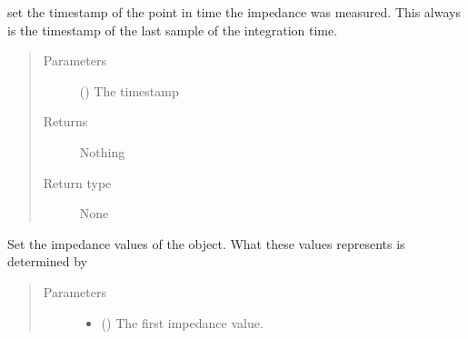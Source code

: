 \documentclass[letterpaper,10pt,english]{sphinxmanual}
\begin{document}
\begin{fulllineitems}
\begin{fulllineitems}
\end{fulllineitems}


\begin{fulllineitems}
\label{\detokenize{index:impedance.impedance.set_timestamp}}
\sphinxAtStartPar
set the timestamp of the point in time the impedance was measured. This always is the timestamp of the last sample of the integration time.
\begin{quote}\begin{description}
\item[{Parameters}] \leavevmode
\sphinxAtStartPar
{} () \textendash{} The timestamp

\item[{Returns}] \leavevmode
\sphinxAtStartPar
Nothing

\item[{Return type}] \leavevmode
\sphinxAtStartPar
None

\end{description}\end{quote}

\end{fulllineitems}


\begin{fulllineitems}
\label{\detokenize{index:impedance.impedance.set_values}}
\sphinxAtStartPar
Set the impedance values of the object. What these values represents is determined by 
\begin{quote}\begin{description}
\item[{Parameters}] \leavevmode\begin{itemize}
\item {} 
\sphinxAtStartPar
{} () \textendash{} The first impedance value.


\end{itemize}
\end{description}
\end{quote}
\end{fulllineitems}
\end{fulllineitems}
\end{document}
